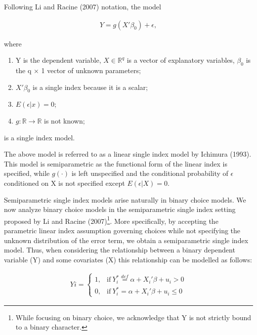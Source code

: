 \documentclass[a4paper]{article}
\begin{document}
Following Li and Racine (2007) notation, the model 

\begin{eqnarray}
Y = g(X'\beta_0) + \epsilon,  %
\end{eqnarray}

where

\begin{enumerate}
	\item Y is the dependent variable, $X\in \mathbb{R}^{q}$ is a vector of explanatory variables, $\beta_0$ is the q $\times$ 1 vector of unknown parameters; %
	\item $X'\beta_0$ is a single index because it is a scalar;
	\item $ E(\epsilon|x) = 0 $;
	\item $g: \mathbb{R} \rightarrow \mathbb{R} $ is not known; %
\end{enumerate}

is a single index model.

\vspace{5mm} 

The above model is referred to as a linear single index model by Ichimura (1993). This model is semiparametric as the functional form of the linear index is specified, while $g(\cdot)$ is left unspecified and the conditional probability of $\epsilon$ conditioned on X is not specified except $ E(\epsilon|X) = 0 $. 

Semiparametric single index models arise naturally in binary choice models. We now analyze binary choice models in the semiparametric single index setting proposed by Li and Racine (2007)\footnote{While focusing on binary choice, we acknowledge that Y is not strictly bound to a binary character.}. More specifically, by accepting the parametric linear index assumption governing choices while not specifying the unknown distribution of the error term, we obtain a semiparametric single index model. Thus, when considering the relationship between a binary dependent variable (Y) and some covariates (X) this relationship can be modelled as follows:

\begin{eqnarray}
    Yi = 
    \begin{cases}
      1, & \text{if}\ Y_i^* \stackrel{def}{=} \alpha + X_i'\beta + u_i > 0 \\
      0, & \text{if}\ Y_i^* = \alpha + X_i'\beta + u_i \leq 0
    \end{cases}
\end{eqnarray}
\end{document}

